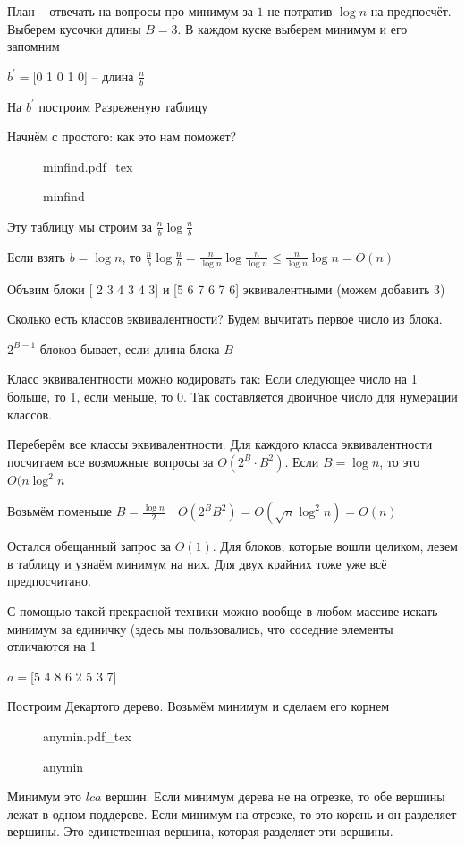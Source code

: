 \documentclass{book}
\newcommand{\p}[1]{#1^{\prime}}
\theoremstyle{definition}
\newcommand{\incfig}[1]{%
    \def\svgwidth{\columnwidth}
    {#1.pdf_tex}
}
\begin{document}
План -- отвечать на вопросы про минимум за $1$ не потратив  $\log n$ на предпосчёт. Выберем кусочки длины $B = 3$. В каждом куске выберем минимум и его запомним

$\p b = $[0 1 0 1 0] -- длина  $\frac{n}{b}$ 

На $\p b$ построим Разреженую таблицу

Начнём с простого: как это нам поможет?

\begin{figure}[!ht]
    \centering
    \incfig{minfind}
    \caption{minfind}
    \label{fig:minfind}
\end{figure}

Эту таблицу мы строим за $\frac{n}{b}\log \frac{n}{b}$ 

Если взять $b = \log n$, то $\frac{n}{b}\log \frac{n}{b} = \frac{n}{\log n}\log \frac{n}{\log n} \leqslant \frac{n}{\log n}\log n = O(n)$

Объвим блоки [ 2 3 4 3 4 3] и [5 6 7 6 7 6] эквивалентными (можем добавить $3$)

Сколько есть классов эквивалентности? Будем вычитать первое число из блока.

$2^{B-1}$ блоков бывает, если длина блока  $B$

Класс эквивалентности можно кодировать так: Если следующее число на 1 больше, то 1, если меньше, то 0. Так составляется двоичное число для нумерации классов.

Переберём все классы эквивалентности. Для каждого класса эквивалентности посчитаем все возможные вопросы за  $O(2^B \cdot  B^2)$. Если $B = \log n$, то это $O(n\log ^2n$

Возьмём поменьше $B = \frac{\log n}{2}\quad O\left( 2^BB^2 \right)  = O(\sqrt{n}\log ^2n) = O(n) $

Остался обещанный запрос за $O(1)$. Для блоков, которые вошли целиком, лезем в таблицу и узнаём минимум на них. Для двух крайних тоже уже всё предпосчитано. 

 \begin{statement}
     С помощью такой прекрасной техники можно вообще в любом массиве искать минимум за единичку (здесь мы пользовались, что соседние элементы отличаются на 1
\end{statement}

$a = $[5 4 8 6 2 5 3 7]

Построим Декартого дерево. Возьмём минимум и сделаем его корнем

\begin{figure}[!ht]
    \centering
    \incfig{anymin}
    \caption{anymin}
    \label{fig:anymin}
\end{figure}

\begin{statement}
    Минимум это $lca$ вершин. Если минимум дерева не на отрезке, то обе вершины лежат в одном поддереве. Если минимум на отрезке, то это корень и он разделяет вершины. Это единственная вершина, которая разделяет эти вершины.
\end{statement}
\end{document}
